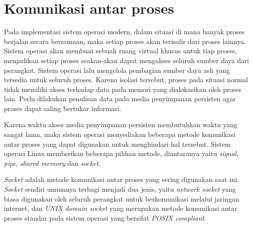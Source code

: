 %
%

\section{Komunikasi antar proses}

Pada implementasi sistem operasi modern, dalam situasi di mana banyak proses berjalan 
secara bersamaan, maka setiap proses akan terisolir dari proses lainnya. Sistem 
operasi akan membuat sebuah ruang virtual khusus untuk tiap proses, menjadikan
setiap proses seakan-akan dapat mengakses seluruh sumber daya dari perangkat. Sistem 
operasi lalu mengelola pembagian sumber daya asli yang tersedia untuk seluruh 
proses. Karena isolasi tersebut, proses pada situasi normal tidak memiliki akses 
terhadap data pada memori yang dialokasikan oleh proses lain. Perlu dilakukan 
penulisan data pada media penyimpanan persisten agar proses dapat saling 
bertukar informasi.

Karena waktu akses media penyimpanan persisten membutuhkan waktu yang sangat 
lama, maka sistem operasi menyediakan beberapa metode komunikasi antar proses 
yang dapat digunakan untuk menghindari hal tersebut. Sistem operasi Linux 
memberikan beberapa pilihan metode, diantaranya yaitu \textit{signal},
\textit{pipe}, \textit{shared memory} dan \textit{socket}.

\textit{Socket} adalah metode komunikasi antar proses yang sering digunakan saat 
ini. \textit{Socket} sendiri umumnya terbagi menjadi dua jenis, yaitu \textit{network 
socket} yang biasa digunakan oleh seluruh perangkat untuk berkomunikasi melalui 
jaringan internet, dan \textit{UNIX domain socket} yang merupakan metode 
komunikasi antar proses standar pada sistem operasi yang bersifat \textit{POSIX 
compliant}.

